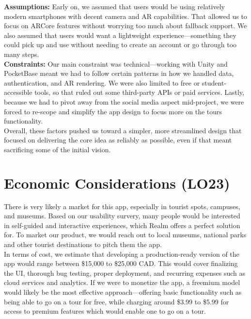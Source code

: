 \documentclass{article}
\begin{document}
\textbf{Assumptions:} Early on, we assumed that users would be using relatively modern smartphones with decent camera and AR capabilities. That allowed us to focus on ARCore features without worrying too much about fallback support. We also assumed that users would want a lightweight experience—something they could pick up and use without needing to create an account or go through too many steps. \\

\textbf{Constraints:} Our main constraint was technical—working with Unity and PocketBase meant we had to follow certain patterns in how we handled data, authentication, and AR rendering. We were also limited to free or student-accessible tools, so that ruled out some third-party APIs or paid services. Lastly, because we had to pivot away from the social media aspect mid-project, we were forced to re-scope and simplify the app design to focus more on the tours functionality. \\

Overall, these factors pushed us toward a simpler, more streamlined design that focused on delivering the core idea as reliably as possible, even if that meant sacrificing some of the initial vision.


\section{Economic Considerations (LO23)}

There is very likely a market for this app, especially in tourist spots, campuses, and museums. Based on our usability survery, many people would be interested in self-guided and interactive experiences, which Realm offers a perfect solution for. To market our product, we would reach out to local museums, national parks and other tourist destinations to pitch them the app. \\

In terms of cost, we estimate that developing a production-ready version of the app would range between \$15,000 to \$25,000 CAD. This would cover finalizing the UI, thorough bug testing, proper deployment, and recurring expenses such as cloud services and analytics. If we were to monetize the app, a freemium model would likely be the most effective approach—offering basic functionality such as being able to go on a tour for free, while charging around \$3.99 to \$5.99 for access to premium features which would enable one to go on a tour. \\
\end{document}

